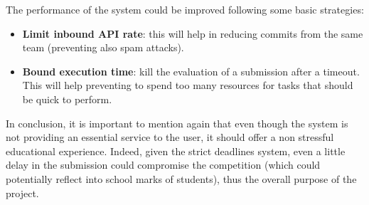 The performance of the system could be improved following some basic strategies:
\begin{itemize}
    \item \textbf{Limit inbound API rate}: this will help in reducing commits from the same team (preventing also spam attacks).
    \item \textbf{Bound execution time}: kill the evaluation of a submission after a timeout. This will help preventing to spend too many resources for tasks that should be quick to perform. 
\end{itemize}
In conclusion, it is important to mention again that even though the system is not providing an essential service to the user, it should offer a non stressful educational experience. Indeed, given the strict deadlines system, even a little delay in the submission could compromise the competition (which could potentially reflect into school marks of students), thus the overall purpose of the project.